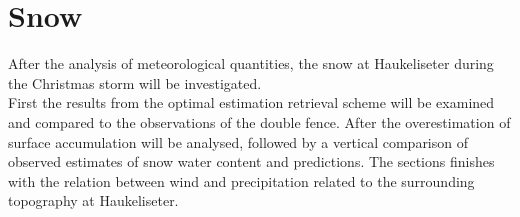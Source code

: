 \section{Snow}
After the analysis of meteorological quantities, the snow at Haukeliseter during the Christmas storm will be investigated.
\\
First the results from the optimal estimation retrieval scheme will be examined and compared to the observations of the double fence. After the overestimation of surface accumulation will be analysed, followed by a vertical comparison of observed estimates of snow water content and predictions. The sections finishes with the relation between wind and precipitation related to the surrounding topography at Haukeliseter. 
\newpage
